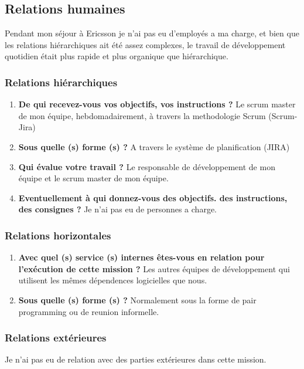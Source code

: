 \documentclass{resume} %
\begin{document}
\subsection{Relations humaines}
	
	
	Pendant mon séjour à Ericsson je n'ai pas eu d'employés a ma charge, et bien que les relations hiérarchiques ait \'et\'e assez complexes, le travail de développement quotidien était plus rapide et plus organique que hiérarchique.

	\subsubsection {Relations hiérarchiques}
		\begin{enumerate}
		\item \textbf{De qui recevez-vous vos objectifs, vos instructions ?}
			Le scrum master de mon équipe, hebdomadairement, \`a travers la methodologie Scrum (Scrum-Jira)
		\item \textbf{Sous quelle (s) forme (s) ?}
			A travers le système de planification (JIRA) 
		\item \textbf{Qui évalue votre travail ?}
			Le responsable de développement de mon équipe et le scrum master de mon équipe.
		\item  \textbf{Eventuellement à qui donnez-vous des objectifs. des instructions, des consignes ?}
			Je n'ai pas eu de personnes a charge.
		\end{enumerate}


	\subsubsection {Relations horizontales}	
	\begin{enumerate}
		\item \textbf{ Avec quel (s) service (s) internes êtes-vous en relation pour l'exécution de cette mission ?}
			Les autres équipes de développement qui utilisent les m\^emes d\'ependences logicielles que nous. 
		\item \textbf{Sous quelle (s) forme (s) ?}
			Normalement sous la forme de pair programming ou de reunion informelle.
	\end {enumerate}	

	\subsubsection {Relations extérieures}
		Je n'ai pas eu de relation avec des parties extérieures dans cette mission.
		
\end{document}
